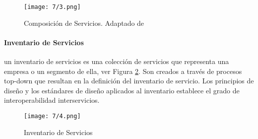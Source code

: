   	\begin{figure}%
  			\centering
  	\texttt{[image: 7/3.png]}
  	\caption{Composición de Servicios. Adaptado de \cite{Erl2007}}
  	\label{fig:composicion}
  \end{figure}
  
  
  \paragraph{Inventario de Servicios}
  
 
 un \gls{inventario de servicios} es una colección de servicios que representa una empresa o un segmento de ella, ver Figura \ref{fig:inventario}. Son creados a través de procesos top-down que resultan en la definición del inventario de servicio. Los principios de diseño y los estándares de diseño aplicados al inventario  establece el grado de interoperabilidad interservicios. 
  
  
  \begin{figure}%
  		\centering
  	\texttt{[image: 7/4.png]}
  	\caption{Inventario de Servicios}
  	\label{fig:inventario}
  \end{figure}
  
  
  
